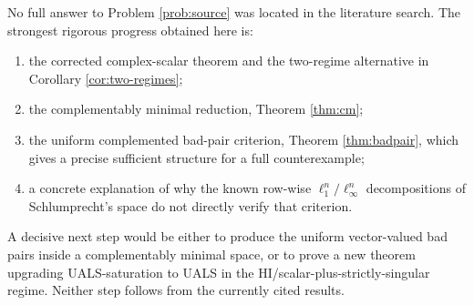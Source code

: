 \documentclass[11pt]{article}
\theoremstyle{definition}
\theoremstyle{remark}
\begin{document}
No full answer to Problem \ref{prob:source} was located in the literature search.  The strongest rigorous progress obtained here is:
\begin{enumerate}[label=(\arabic*),leftmargin=2.2em]
\item the corrected complex-scalar theorem and the two-regime alternative in Corollary \ref{cor:two-regimes};
\item the complementably minimal reduction, Theorem \ref{thm:cm};
\item the uniform complemented bad-pair criterion, Theorem \ref{thm:badpair}, which gives a precise sufficient structure for a full counterexample;
\item a concrete explanation of why the known row-wise $\ell_1^n/\ell_\infty^n$ decompositions of Schlumprecht's space do not directly verify that criterion.
\end{enumerate}

A decisive next step would be either to produce the uniform vector-valued bad pairs inside a complementably minimal space, or to prove a new theorem upgrading UALS-saturation to UALS in the HI/scalar-plus-strictly-singular regime.  Neither step follows from the currently cited results.
\end{document}
